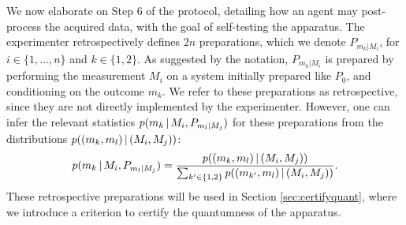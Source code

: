 
We now elaborate on Step 6 of the protocol, detailing how an agent may post-process the acquired data, with the goal of self-testing the apparatus. The experimenter retrospectively defines $2n$ preparations, which we denote $P_{m_k\vert M_i}$, for $i\in\{1,\dots,n\}$ and $k\in\{1,2\}$. As suggested by the notation, $P_{m_k\vert M_i}$ is prepared by performing the measurement $M_i$ on a system initially prepared like $P_0$, and conditioning on the outcome $m_k$. We refer to these preparations as retrospective, since they are not directly implemented by the experimenter. However, one can infer the relevant statistics $p(m_k\thinspace\vert\thinspace M_i, P_{m_l\vert M_j})$ for these preparations from the distributions $p((m_k,m_l)\thinspace\vert\thinspace (M_i,M_j))$:
\begin{equation*}
p(m_k\thinspace\vert\thinspace M_i, P_{m_l\vert M_j})=\frac{p((m_k,m_l)\thinspace\vert\thinspace (M_i,M_j))}{\sum_{k'\in\{1,2\}} p((m_{k'},m_l)\thinspace\vert\thinspace (M_i,M_j))}.
\end{equation*}
These retrospective preparations will be used in Section \ref{sec:certifyquant}, where we introduce a criterion to certify the quantumness of the apparatus.

